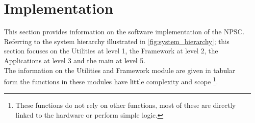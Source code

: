 \chapter{Implementation}
This section provides information on the software implementation of the NPSC. Referring to the system hierarchy illustrated in \cref{fig:system_hierarchy}; this section focuses on the Utilities at level 1, the Framework at level 2, the Applications at level 3 and the main at level 5.\\
The information on the Utilities and Framework module are given in tabular form the functions in these modules have little complexity and scope \footnote{These functions do not rely on other functions, most of these are directly linked to the hardware or perform simple logic.}. 
   
